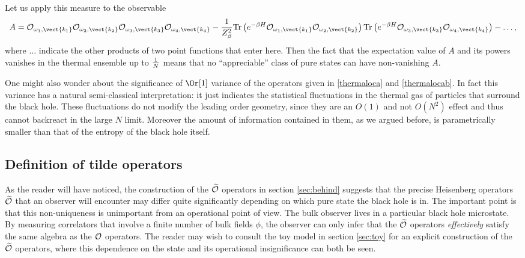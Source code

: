 Let us apply this measure to the observable 
\[
A = {\cal O}_{\omega_1, \vect{k_1}}  {\cal O}_{\omega_2, \vect{k_2}}  {\cal O}_{\omega_3, \vect{k_3}}  {\cal O}_{\omega_4, \vect{k_4}}   -  {1 \over Z_{\beta}^2} {\rm Tr} \left(e^{-\beta H} {\cal O}_{\omega_1, \vect{k_1}}  {\cal O}_{\omega_2, \vect{k_2}} \right)  {\rm Tr} \left(e^{-\beta H} {\cal O}_{\omega_3, \vect{k_3}}  {\cal O}_{\omega_4, \vect{k_4}} \right)- \ldots,
\]
where $\ldots$ indicate the other
products of two point functions that enter here. Then the fact that 
the expectation value of $A$ and its powers vanishes in the thermal ensemble up to ${1 \over N}$ means that no ``appreciable'' class of pure states can have non-vanishing $A$.

One might also wonder about the significance of $\Or[1]$ variance of
the operators given in \eqref{thermaloca} and \eqref{thermalocab}. In fact
this variance has a natural semi-classical interpretation: it just indicates the statistical fluctuations in the thermal gas of particles that 
surround the black hole. These fluctuations do not modify the leading order geometry, since they are an $O(1)$ and not $O(N^2)$ effect and thus cannot backreact in the large $N$ limit. Moreover the amount of information 
contained in them, as we argued before, is parametrically smaller than that of the entropy of the black hole itself.







\subsection{Definition of tilde operators}
As the reader will have noticed, the construction of the $\widetilde{\cal O}$ operators in section \ref{sec:behind} suggests that the precise Heisenberg operators $\widetilde{\cal O}$ that an observer will encounter may differ quite significantly depending on which pure state the black hole is in. The important point is that this non-uniqueness is unimportant from an operational point of view. The bulk observer lives in a particular black hole microstate. By measuring correlators that involve a finite number of bulk fields $\phi$, the observer can only infer that the $\widetilde{\cal O}$ operators {\em effectively} satisfy the same algebra as the ${\cal O}$ operators. The reader may wish to consult the toy model in section \ref{sec:toy} for an explicit construction of the $\widetilde{\cal O}$ operators, where this dependence on the state and its operational insignificance can both be seen. 

